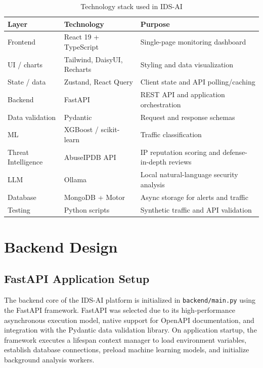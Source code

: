 \documentclass[12pt,a4paper]{report}
\begin{document}
\begin{table}[htbp]
  \centering
  \caption{Technology stack used in IDS-AI}
  \label{tab:stack}
  \begin{tabular}{p{}p{}p{}}
    \toprule
    \textbf{Layer} & \textbf{Technology} & \textbf{Purpose} \\
    \midrule
    Frontend      & React 19 + TypeScript & Single-page monitoring dashboard \\
    UI / charts   & Tailwind, DaisyUI, Recharts & Styling and data visualization \\
    State / data  & Zustand, React Query  & Client state and API polling/caching \\
    Backend       & FastAPI               & REST API and application orchestration \\
    Data validation & Pydantic            & Request and response schemas \\
    ML            & XGBoost / scikit-learn & Traffic classification \\
    Threat Intelligence & AbuseIPDB API          & IP reputation scoring and defense-in-depth reviews \\
    LLM           & Ollama                & Local natural-language security analysis \\
    Database      & MongoDB + Motor       & Async storage for alerts and traffic \\
    Testing       & Python scripts        & Synthetic traffic and API validation \\
    \bottomrule
  \end{tabular}
\end{table}

\section{Backend Design}

\subsection{FastAPI Application Setup}

The backend core of the IDS-AI platform is initialized in \texttt{backend/main.py} using the FastAPI framework. FastAPI was selected due to its high-performance asynchronous execution model, native support for OpenAPI documentation, and integration with the Pydantic data validation library. On application startup, the framework executes a lifespan context manager to load environment variables, establish database connections, preload machine learning models, and initialize background analysis workers.
\end{document}
